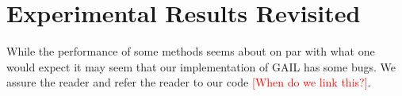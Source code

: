 \documentclass[10pt]{article}
\renewcommand{\cite}{\citep}
\theoremstyle{plain}
\theoremstyle{remark}
\newcommand{\gersi}[1]{\textcolor{red}{[#1]}}
\begin{document}
\section{Experimental Results Revisited}

While the performance of some methods seems about on par with what one would expect it may seem that our implementation of GAIL \cite{Ho2016}
has some bugs. We assure the reader and refer the reader to our code \gersi{When do we link this?}.
    
    
    
    
    
    
    
\end{document}
